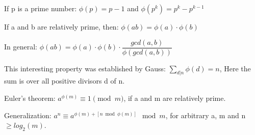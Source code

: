 If p is a prime number: $\phi (p) = p - 1$ and $\phi(p^k) = p^k - p^{k-1}$

If a and b are relatively prime, then: $\phi(a b) = \phi(a) \cdot \phi(b)$

In general: $\phi(ab) = \phi(a) \cdot \phi(b) \cdot \dfrac{gcd(a, b)}{\phi(gcd(a, b))}$

This interesting property was established by Gauss: $\sum_{d|n} \phi{(d)} = n$, Here the sum is over all positive divisors d of n.

Euler's theorem: $a^{\phi(m)} \equiv 1 \pmod m$, if a and m are relatively prime.

Generalization: $a^{n}\equiv a^{\phi(m)+[n \bmod \phi(m)]} \mod m$, for arbitrary a, m and n $\ge log_2(m)$.